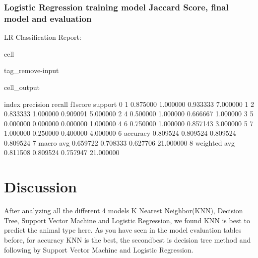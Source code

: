 \documentclass[letterpaper,10pt,english]{jupyterBook}
\begin{document}
\subsection{Logistic Regression training model Jaccard Score, final model and evaluation}
\label{\detokenize{analysis:logistic-regression-training-model-jaccard-score-final-model-and-evaluation}}
\sphinxAtStartPar
LR Classification Report:

\begin{sphinxuseclass}{cell}
\begin{sphinxuseclass}{tag_remove-input}\begin{sphinxVerbatimOutput}

\begin{sphinxuseclass}{cell_output}
\begin{sphinxVerbatim}[commandchars=\\\{\}]
          index  precision    recall  f1\PYGZhy{}score    support
0             1   0.875000  1.000000  0.933333   7.000000
1             2   0.833333  1.000000  0.909091   5.000000
2             4   0.500000  1.000000  0.666667   1.000000
3             5   0.000000  0.000000  0.000000   1.000000
4             6   0.750000  1.000000  0.857143   3.000000
5             7   1.000000  0.250000  0.400000   4.000000
6      accuracy   0.809524  0.809524  0.809524   0.809524
7     macro avg   0.659722  0.708333  0.627706  21.000000
8  weighted avg   0.811508  0.809524  0.757947  21.000000
\end{sphinxVerbatim}

\end{sphinxuseclass}\end{sphinxVerbatimOutput}

\end{sphinxuseclass}
\end{sphinxuseclass}
\sphinxstepscope


\chapter{Discussion}
\label{\detokenize{discussion:discussion}}\label{\detokenize{discussion::doc}}
\sphinxAtStartPar
After analyzing all the different 4 models K Nearest Neighbor(KNN), Decision Tree, Support Vector Machine and Logistic Regression, we found KNN is best to predict the animal type here. As you have seen in the model evaluation tables before, for accuracy KNN is the best, the second\sphinxhyphen{}best is decision tree method and following by Support Vector Machine and Logistic Regression.
\end{document}

